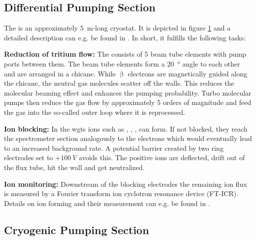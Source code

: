     \subsection{Differential Pumping Section}
    \label{sec:diffPumpingSection}
    \begin{figure}[t]
	    \label{fig:dps}
    \end{figure}
    The  is an approximately \SI{5}{m}-long cryostat. It is depicted in figure \ref{fig:dps} and a detailed description can e.g. be found in \cite{Kosmider2012}. In short, it fulfills the following tasks:
    
    {\par\textbf{Reduction of tritium flow:}
    The  consists of 5 beam tube elements with pump ports between them. The beam tube elements form a \SI{20}{\degree} angle to each other and are arranged in a chicane. While $\upbeta$ electrons are magnetically guided along the chicane, the neutral gas molecules scatter off the walls. This reduces the molecular beaming effect and enhances the pumping probability. Turbo molecular pumps then reduce the gas flow by approximately 5 orders of magnitude and feed the gas into the so-called outer loop where it is reprocessed.}
    
    {\par\textbf{Ion blocking:}
    In the \gls{wgts} ions such as , , ,  can form. If not blocked, they reach the spectrometer section analogously to the electrons which would eventually lead to an increased background rate. A potential barrier created by two ring electrodes set to $+\SI{100}{V}$ avoids this. The positive ions are deflected, drift out of the flux tube, hit the wall and get neutralized.}
    
    {\par\textbf{Ion monitoring:}
    Downstream of the blocking electrodes the remaining ion flux is measured by a Fourier transform ion cyclotron resonance device (FT-ICR). Details on ion forming and their measurement can e.g. be found in \cite{Ubieto2009}.}
    
    \subsection{Cryogenic Pumping Section}
    \label{sec:cryoPumpingSection}
    \begin{figure}[t]
	    \label{fig:cps}
    \end{figure}
    
